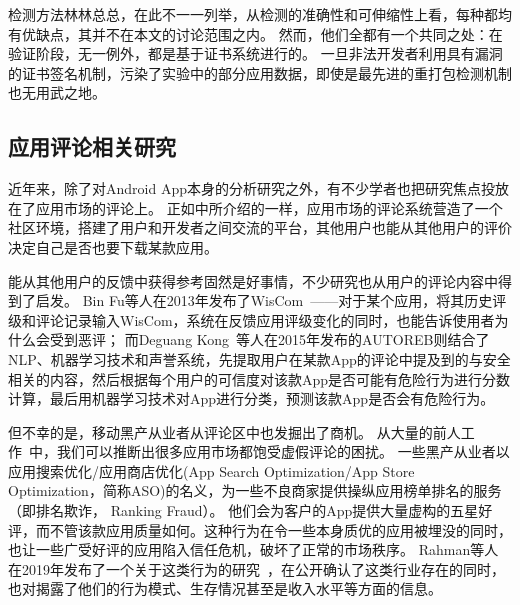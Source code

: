 检测方法林林总总，在此不一一列举，从检测的准确性和可伸缩性上看，每种都均有优缺点，其并不在本文的讨论范围之内。
然而，他们全都有一个共同之处：在验证阶段，无一例外，都是基于证书系统进行的。
一旦非法开发者利用具有漏洞的证书签名机制，污染了实验中的部分应用数据，即使是最先进的重打包检测机制也无用武之地。

\subsection{应用评论相关研究}
近年来，除了对Android App本身的分析研究之外，有不少学者也把研究焦点投放在了应用市场的评论上。
正如中所介绍的一样，应用市场的评论系统营造了一个社区环境，搭建了用户和开发者之间交流的平台，其他用户也能从其他用户的评价决定自己是否也要下载某款应用。

能从其他用户的反馈中获得参考固然是好事情，不少研究也从用户的评论内容中得到了启发。
Bin Fu等人在2013年发布了WisCom~\cite{fu2013people}——对于某个应用，将其历史评级和评论记录输入WisCom，系统在反馈应用评级变化的同时，也能告诉使用者为什么会受到恶评；
而Deguang Kong~\cite{kong2015autoreb}等人在2015年发布的AUTOREB则结合了NLP、机器学习技术和声誉系统，先提取用户在某款App的评论中提及到的与安全相关的内容，然后根据每个用户的可信度对该款App是否可能有危险行为进行分数计算，最后用机器学习技术对App进行分类，预测该款App是否会有危险行为。

但不幸的是，移动黑产从业者从评论区中也发掘出了商机。
从大量的前人工作~\cite{hernandez2019the, xie2014grouptie, zhu2014discovery, hu2019want, chen2017toward, xie2016you, hooi2016fraudar}中，我们可以推断出很多应用市场都饱受虚假评论的困扰。
一些黑产从业者以应用搜索优化/应用商店优化(App Search Optimization/App Store Optimization，简称ASO)的名义，为一些不良商家提供操纵应用榜单排名的服务（即排名欺诈， Ranking Fraud）。
他们会为客户的App提供大量虚构的五星好评，而不管该款应用质量如何。这种行为在令一些本身质优的应用被埋没的同时，也让一些广受好评的应用陷入信任危机，破坏了正常的市场秩序。
Rahman等人在2019年发布了一个关于这类行为的研究~\cite{rahman2019art}，在公开确认了这类行业存在的同时，也对揭露了他们的行为模式、生存情况甚至是收入水平等方面的信息。


